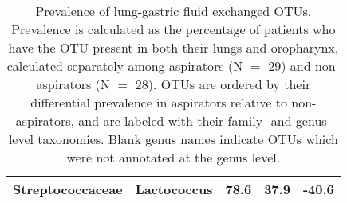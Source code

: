 \begin{table}
\begin{center}
\begin{tabular}{ccccc}
	Streptococcaceae & Lactococcus & 78.6 & 37.9 & -40.6 \\
	\bottomrule
\end{tabular}
\caption{Prevalence of lung-gastric fluid exchanged OTUs. Prevalence is calculated as the percentage of patients who have the OTU present in both their lungs and oropharynx, calculated separately among aspirators (N $=$ 29) and non-aspirators (N $=$ 28). OTUs are ordered by their differential prevalence in aspirators relative to non-aspirators, and are labeled with their family- and genus-level taxonomies. Blank genus names indicate OTUs which were not annotated at the genus level.}\label{tab:bal-gastric-exchanged}
\end{center}
\end{table}

\FloatBarrier
\newpage \pdfpagewidth=8.5in \pdfpageheight=11in


